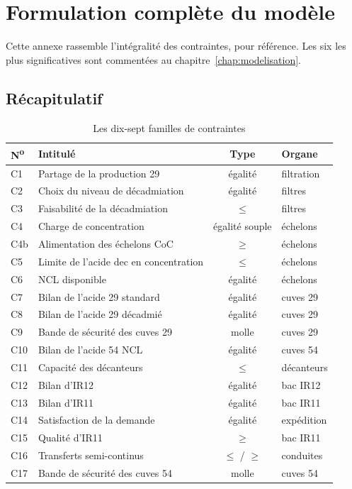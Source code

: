 \chapter{Formulation complète du modèle}
\label{ann:contraintes}

Cette annexe rassemble l'intégralité des contraintes, pour référence. Les six les plus
significatives sont commentées au chapitre~\ref{chap:modelisation}.

\section{Récapitulatif}

\begin{table}[H]
\centering
\caption{Les dix-sept familles de contraintes}
\label{tab:recap-contraintes}
\begin{tabular}{@{}llcl@{}}
\toprule
\textbf{N\textsuperscript{o}} & \textbf{Intitulé} & \textbf{Type} & \textbf{Organe} \\
\midrule
C1 & Partage de la production 29 & égalité & filtration \\
C2 & Choix du niveau de décadmiation & égalité & filtres \\
C3 & Faisabilité de la décadmiation & $\le$ & filtres \\
C4 & Charge de concentration & égalité souple & échelons \\
C4b & Alimentation des échelons CoC & $\ge$ & échelons \\
C5 & Limite de l'acide dec en concentration & $\le$ & échelons \\
C6 & NCL disponible & égalité & échelons \\
C7 & Bilan de l'acide 29 standard & égalité & cuves 29 \\
C8 & Bilan de l'acide 29 décadmié & égalité & cuves 29 \\
C9 & Bande de sécurité des cuves 29 & molle & cuves 29 \\
C10 & Bilan de l'acide 54 NCL & égalité & cuves 54 \\
C11 & Capacité des décanteurs & $\le$ & décanteurs \\
C12 & Bilan d'IR12 & égalité & bac IR12 \\
C13 & Bilan d'IR11 & égalité & bac IR11 \\
C14 & Satisfaction de la demande & égalité & expédition \\
C15 & Qualité d'IR11 & $\ge$ & bac IR11 \\
C16 & Transferts semi-continus & $\le$ / $\ge$ & conduites \\
C17 & Bande de sécurité des cuves 54 & molle & cuves 54 \\
\bottomrule
\end{tabular}
\end{table}

